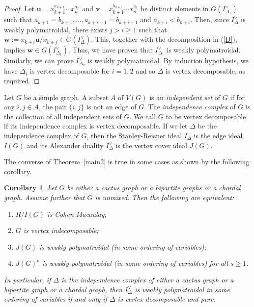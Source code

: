 \documentclass[12pt]{amsart}
\newtheorem{Corollary}[Theorem]{Corollary}
\begin{document}
\begin{proof}
 Let $\mathbf{u}=x_{k+1}^{a_{k+1}}\cdots x_n^{a_n}$ and $\mathbf{v}=x_{k+1}^{b_{k+1}}\cdots x_n^{b_n}$ be distinct elements in $G(I_{\Delta_1}^{\vee})$ such that $a_{k+1}=b_{k+1},\ldots,a_{k+i-1}=b_{k+i-1}$ and  $a_{k+i}<b_{k+i}$. Then, since $I_{\Delta}^{\vee}$ is weakly polymatroidal, there exists $j>i\geq 1$ such that $\mathbf{w}:=x_{k+i}\mathbf{u}/x_{k+j}\in G(I_{\Delta}^{\vee})$. This, together with the decomposition in (\ref{D}), implies $\mathbf{w}\in G(I_{\Delta_1}^{\vee})$. Thus, we have proven that $I_{\Delta_1}^{\vee}$ is weakly polymatroidal. Similarly, we can prove $I_{\Delta_2}^{\vee}$ is weakly polymatroidal.
 By induction hypothesis, we have $\Delta_i$ is vertex decomposable for $i=1,2$ and so $\Delta$ is vertex decomposable, as required.
\end{proof}

Let $G$ be a simple graph. A subset $A$ of $V(G)$ is an {\it independent  set} of $G$ if for any $i,j\in A$, the pair $\{i,j\}$ is not an edge of $G$. The {\it independence complex} of $G$ is the collection of all independent  sets of $G$. We call $G$ to be vertex decomposable if its independence complex is vertex decomposable. If we let $\Delta$ be the  independence complex of $G$, then the Stanley-Reisner ideal $I_{\Delta}$ is the edge ideal $I(G)$ and its Alexander duality  $I_{\Delta}^{\vee}$ is the vertex cover ideal $J(G)$.


The converse of Theorem~\ref{main2} is true in some cases as shown by the following corollary.

\begin{Corollary} \label{3.2} Let $G$ be either a cactus graph or a bipartite graphs or  a chordal graph. Assume further that $G$ is unmixed. Then the following are equivalent:

\begin{enumerate}
  \item $R/I(G)$ is Cohen-Macaulay;
  \item $G$ is vertex indecomposable;
  \item $J(G)$ is weakly polymatroidal (in some ordering  of variables);
   \item $J(G)^k$ is weakly polymatroidal (in some ordering  of variables) for all $s\geq 1$.
\end{enumerate}

 In particular, if $\Delta$ is the independence complex of either a  cactus graph or a  bipartite graph or a chordal graph, then $I_{\Delta}^{\vee}$ is weakly polymatroidal in some ordering of variables if and only if $\Delta$ is vertex decomposable and pure.
\end{Corollary}
\end{document}
